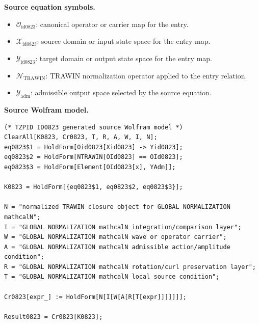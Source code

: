 \begin{minipage}[t]{0.49\linewidth}
\begingroup
\small
\raggedright
\textbf{Source equation symbols.}\par
\begin{itemize}[leftmargin=1.35em,itemsep=1pt,topsep=1pt,parsep=0pt]
    \item $\mathcal{O}_{\mathrm{id0823}}$: canonical operator or carrier map for the entry.
    \item $\mathcal{X}_{\mathrm{id0823}}$: source domain or input state space for the entry map.
    \item $\mathcal{Y}_{\mathrm{id0823}}$: target domain or output state space for the entry map.
    \item $\mathcal{N}_{\mathrm{TRAWIN}}$: TRAWIN normalization operator applied to the entry relation.
    \item $\mathcal{Y}_{\mathrm{adm}}$: admissible output space selected by the source equation.
\end{itemize}
\endgroup
\end{minipage}\hfill
\begin{minipage}[t]{0.47\linewidth}
\begingroup
\scriptsize
\raggedright
\textbf{Source Wolfram model.}\par
\begin{Verbatim}[fontsize=\tiny,breaklines=true,breakanywhere=true]
(* TZPID ID0823 generated source Wolfram model *)
ClearAll[K0823, Cr0823, T, R, A, W, I, N];
eq0823$1 = HoldForm[Oid0823[Xid0823] -> Yid0823];
eq0823$2 = HoldForm[NTRAWIN[OId0823] == OId0823];
eq0823$3 = HoldForm[Element[OId0823[x], YAdm]];

K0823 = HoldForm[{eq0823$1, eq0823$2, eq0823$3}];

N = "normalized TRAWIN closure object for GLOBAL NORMALIZATION mathcalN";
I = "GLOBAL NORMALIZATION mathcalN integration/comparison layer";
W = "GLOBAL NORMALIZATION mathcalN wave or operator carrier";
A = "GLOBAL NORMALIZATION mathcalN admissible action/amplitude condition";
R = "GLOBAL NORMALIZATION mathcalN rotation/curl preservation layer";
T = "GLOBAL NORMALIZATION mathcalN local source condition";

Cr0823[expr_] := HoldForm[N[I[W[A[R[T[expr]]]]]]];

Result0823 = Cr0823[K0823];
\end{Verbatim}
\endgroup
\end{minipage}


